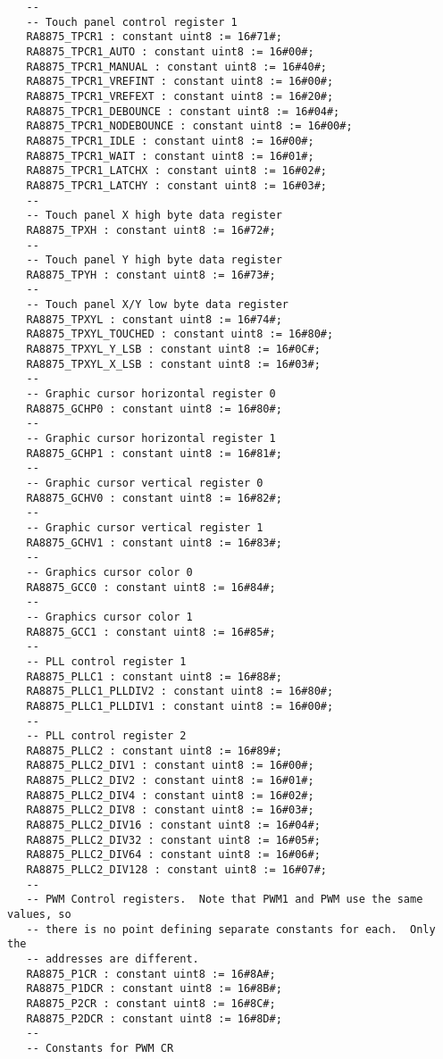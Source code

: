\documentclass[10pt, openany]{book}
\begin{document}
\begin{lstlisting}
   --
   -- Touch panel control register 1
   RA8875_TPCR1 : constant uint8 := 16#71#;
   RA8875_TPCR1_AUTO : constant uint8 := 16#00#;
   RA8875_TPCR1_MANUAL : constant uint8 := 16#40#;
   RA8875_TPCR1_VREFINT : constant uint8 := 16#00#;
   RA8875_TPCR1_VREFEXT : constant uint8 := 16#20#;
   RA8875_TPCR1_DEBOUNCE : constant uint8 := 16#04#;
   RA8875_TPCR1_NODEBOUNCE : constant uint8 := 16#00#;
   RA8875_TPCR1_IDLE : constant uint8 := 16#00#;
   RA8875_TPCR1_WAIT : constant uint8 := 16#01#;
   RA8875_TPCR1_LATCHX : constant uint8 := 16#02#;
   RA8875_TPCR1_LATCHY : constant uint8 := 16#03#;
   --
   -- Touch panel X high byte data register
   RA8875_TPXH : constant uint8 := 16#72#;
   --
   -- Touch panel Y high byte data register
   RA8875_TPYH : constant uint8 := 16#73#;
   --
   -- Touch panel X/Y low byte data register
   RA8875_TPXYL : constant uint8 := 16#74#;
   RA8875_TPXYL_TOUCHED : constant uint8 := 16#80#;
   RA8875_TPXYL_Y_LSB : constant uint8 := 16#0C#;
   RA8875_TPXYL_X_LSB : constant uint8 := 16#03#;
   --
   -- Graphic cursor horizontal register 0
   RA8875_GCHP0 : constant uint8 := 16#80#;
   --
   -- Graphic cursor horizontal register 1
   RA8875_GCHP1 : constant uint8 := 16#81#;
   --
   -- Graphic cursor vertical register 0
   RA8875_GCHV0 : constant uint8 := 16#82#;
   --
   -- Graphic cursor vertical register 1
   RA8875_GCHV1 : constant uint8 := 16#83#;
   --
   -- Graphics cursor color 0
   RA8875_GCC0 : constant uint8 := 16#84#;
   --
   -- Graphics cursor color 1
   RA8875_GCC1 : constant uint8 := 16#85#;
   --
   -- PLL control register 1
   RA8875_PLLC1 : constant uint8 := 16#88#;
   RA8875_PLLC1_PLLDIV2 : constant uint8 := 16#80#;
   RA8875_PLLC1_PLLDIV1 : constant uint8 := 16#00#;
   --
   -- PLL control register 2
   RA8875_PLLC2 : constant uint8 := 16#89#;
   RA8875_PLLC2_DIV1 : constant uint8 := 16#00#;
   RA8875_PLLC2_DIV2 : constant uint8 := 16#01#;
   RA8875_PLLC2_DIV4 : constant uint8 := 16#02#;
   RA8875_PLLC2_DIV8 : constant uint8 := 16#03#;
   RA8875_PLLC2_DIV16 : constant uint8 := 16#04#;
   RA8875_PLLC2_DIV32 : constant uint8 := 16#05#;
   RA8875_PLLC2_DIV64 : constant uint8 := 16#06#;
   RA8875_PLLC2_DIV128 : constant uint8 := 16#07#;
   --
   -- PWM Control registers.  Note that PWM1 and PWM use the same values, so
   -- there is no point defining separate constants for each.  Only the
   -- addresses are different.
   RA8875_P1CR : constant uint8 := 16#8A#;
   RA8875_P1DCR : constant uint8 := 16#8B#;
   RA8875_P2CR : constant uint8 := 16#8C#;
   RA8875_P2DCR : constant uint8 := 16#8D#;
   --
   -- Constants for PWM CR

\end{lstlisting}
\end{document}
